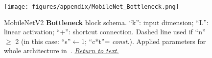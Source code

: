     \begin{minipage}{\columnwidth}
        \begin{figure}[H]
        \begin{center}
        \texttt{[image: figures/appendix/MobileNet\_Bottleneck.png]}
        \caption{MobileNetV2 \textbf{Bottleneck} block schema. 
                 ``k'': input dimension; 
                 ``L'': linear activation; ``+'': shortcut connection.
                 Dashed line used if ``n'' $\geq$ 2 (in this case: ``s''$\leftarrow$1; ``c*t''= \textit{const.}).
                 Applied parameters for whole architecture in~.
                \newline
                \protect\hyperref[fig:Arch_MobN2]{\textit{Return to text.}}
                }
                \space\label{fig:MobN2_Bot}
        \end{center}
        \end{figure}
        \end{minipage}   
    
    
    
